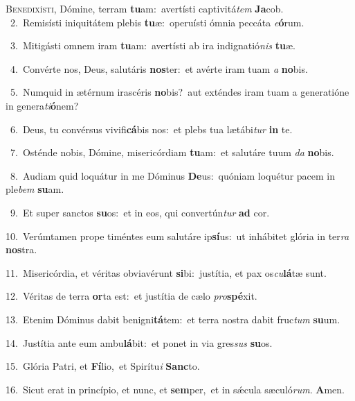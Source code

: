 \lettrine{\initial\textcolor{\initialcolor}{B}}{enedixísti,} Dómine, terram \textbf{tu}\-am:~\star avertísti captivitá\textit{tem} \textbf{Ja}\-cob.\\
{\numbfont\textcolor{\numbcolor}{~2.}}~Remisísti iniquitátem plebis \textbf{tu}\-æ:~\star operuísti ómnia peccáta \textit{e}\-\textbf{ó}rum.\par
{\numbfont\textcolor{\numbcolor}{~3.}}~Mitigásti omnem iram \textbf{tu}\-am:~\star avertísti ab ira indignatió\textit{nis} \textbf{tu}\-æ.\par
{\numbfont\textcolor{\numbcolor}{~4.}}~Convérte nos, Deus, salutáris \textbf{nos}\-ter:~\star et avérte iram tuam \textit{a} \textbf{no}\-bis.\par
{\numbfont\textcolor{\numbcolor}{~5.}}~Numquid in ætérnum irascéris \textbf{no}\-bis?~\star aut exténdes iram tuam a generatióne in genera\-\textit{ti}\-\textbf{ó}nem?\par
{\numbfont\textcolor{\numbcolor}{~6.}}~Deus, tu convérsus vivifi\-\textbf{cá}\-bis nos:~\star et plebs tua lætábi\textit{tur} \textbf{in} te.\par
{\numbfont\textcolor{\numbcolor}{~7.}}~Osténde nobis, Dómine, misericórdiam \textbf{tu}\-am:~\star et salutáre tuum \textit{da} \textbf{no}\-bis.\par
{\numbfont\textcolor{\numbcolor}{~8.}}~Audiam quid loquátur in me Dóminus \textbf{De}\-us:~\star quóniam loquétur pacem in ple\textit{bem} \textbf{su}\-am.\par
{\numbfont\textcolor{\numbcolor}{~9.}}~Et super sanctos \textbf{su}\-os:~\star et in eos, qui convertún\textit{tur} \textbf{ad} cor.\par
{\numbfont\textcolor{\numbcolor}{10.}}~Verúmtamen prope timéntes eum salutáre ip\-\textbf{sí}\-us:~\star ut inhábitet glória in ter\textit{ra} \textbf{nos}\-tra.\par
{\numbfont\textcolor{\numbcolor}{11.}}~Misericórdia, et véritas obviavérunt \textbf{si}\-bi:~\star justítia, et pax os\-\textit{cu}\-\textbf{lá}tæ sunt.\par
{\numbfont\textcolor{\numbcolor}{12.}}~Véritas de terra \textbf{or}\-ta est:~\star et justítia de cælo \textit{pro}\-\textbf{spé}xit.\par
{\numbfont\textcolor{\numbcolor}{13.}}~Etenim Dóminus dabit benigni\-\textbf{tá}\-tem:~\star et terra nostra dabit fruc\textit{tum} \textbf{su}\-um.\par
{\numbfont\textcolor{\numbcolor}{14.}}~Justítia ante eum ambu\-\textbf{lá}\-bit:~\star et ponet in via gres\textit{sus} \textbf{su}\-os.\par
{\numbfont\textcolor{\numbcolor}{15.}}~Glória Patri, et \textbf{Fí}\-lio,~\star et Spirítu\textit{i} \textbf{Sanc}\-to.\par
{\numbfont\textcolor{\numbcolor}{16.}}~Sicut erat in princípio, et nunc, et \textbf{sem}\-per,~\star et in sǽcula sæculó\-\textit{rum}\-. \textbf{A}\-men.\par
